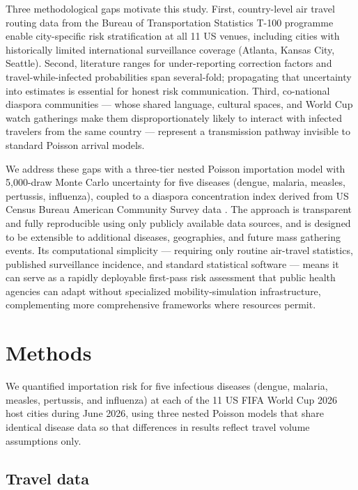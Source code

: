 \documentclass[12pt, a4paper]{article}
\begin{document}
Three methodological gaps motivate this study. First, country-level
air travel routing data from the Bureau of Transportation Statistics
T-100 programme enable city-specific risk stratification at all 11 US
venues, including cities with historically limited international
surveillance coverage (Atlanta, Kansas City, Seattle). Second,
literature ranges for under-reporting correction factors and
travel-while-infected probabilities span several-fold; propagating
that uncertainty into estimates is essential for honest risk
communication. Third, co-national diaspora communities --- whose
shared language, cultural spaces, and World Cup watch gatherings make
them disproportionately likely to interact with infected travelers
from the same country --- represent a transmission pathway invisible
to standard Poisson arrival models.

We address these gaps with a three-tier nested Poisson importation
model with 5,000-draw Monte Carlo uncertainty for five diseases
(dengue, malaria, measles, pertussis, influenza), coupled to a
diaspora concentration index derived from US Census Bureau American
Community Survey data \citep{Census2026WC, tidycensus}.
The approach is transparent and fully reproducible using only publicly
available data sources, and is designed to be extensible to additional
diseases, geographies, and future mass gathering events.
Its computational simplicity --- requiring only routine air-travel
statistics, published surveillance incidence, and standard statistical
software --- means it can serve as a rapidly deployable first-pass
risk assessment that public health agencies can adapt without
specialized mobility-simulation infrastructure, complementing more
comprehensive frameworks where resources permit.

\section{Methods}

We quantified importation risk for five infectious diseases
(dengue, malaria, measles, pertussis, and influenza) at each of the
11 US FIFA World Cup 2026 host cities during June 2026, using three
nested Poisson models that share identical disease data so that
differences in results reflect travel volume assumptions only.

\subsection{Travel data}
\end{document}
